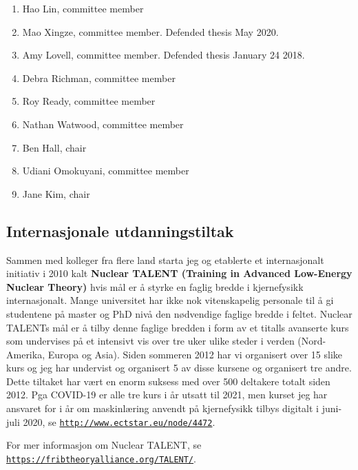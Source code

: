 \documentclass[aps,floatfix,preprint]{revtex4-1}
\begin{document}
\begin{enumerate}
\item Hao Lin, committee member

\item Mao Xingze, committee member. Defended thesis May 2020.

\item Amy Lovell, committee member. Defended thesis January 24 2018.

\item Debra Richman, committee member

\item Roy Ready, committee member

\item Nathan Watwood, committee member 

\item Ben Hall, chair

\item Udiani Omokuyani, committee member

\item Jane Kim, chair
\end{enumerate}


\subsection*{Internasjonale utdanningstiltak}

Sammen med kolleger fra flere land starta jeg og etablerte et
internasjonalt initiativ i 2010 kalt \textbf{Nuclear TALENT (Training in
Advanced Low-Energy Nuclear Theory)} hvis mål er å styrke
en faglig bredde i kjernefysikk internasjonalt. Mange universitet har
ikke nok vitenskapelig personale til å gi studentene på master og PhD
nivå den nødvendige faglige bredde i feltet. Nuclear TALENTs mål
er å tilby denne faglige bredden i form av et titalls avanserte kurs
som undervises på et intensivt vis over tre uker ulike steder i verden
(Nord-Amerika, Europa og Asia). Siden sommeren 2012 har vi organisert
over 15 slike kurs og jeg har undervist og organisert 5 av disse
kursene og organisert tre andre. Dette tiltaket har vært en enorm
suksess med over 500 deltakere totalt siden 2012. Pga COVID-19 er alle
tre kurs i år utsatt til 2021, men kurset jeg har ansvaret for i år om maskinlæring anvendt på kjernefysikk tilbys
digitalt i juni-juli 2020, se \href{{http://www.ectstar.eu/node/4472}}{\nolinkurl{http://www.ectstar.eu/node/4472}}.



For mer informasjon om Nuclear TALENT, se \href{{https://fribtheoryalliance.org/TALENT/}}{\nolinkurl{https://fribtheoryalliance.org/TALENT/}}.
\end{document}
